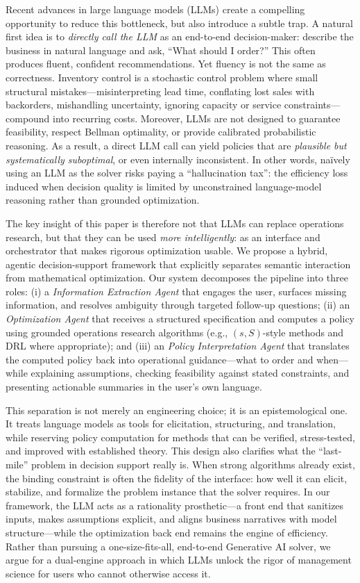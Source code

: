   

Recent advances in large language models (LLMs) create a compelling opportunity to reduce this bottleneck, but also introduce a subtle trap. A natural first idea is to \emph{directly call the LLM} as an end-to-end decision-maker: describe the business in natural language and ask, “What should I order?” This often produces fluent, confident recommendations. Yet fluency is not the same as correctness. Inventory control is a stochastic control problem where small structural mistakes—misinterpreting lead time, conflating lost sales with backorders, mishandling uncertainty, ignoring capacity or service constraints—compound into recurring costs. Moreover, LLMs are not designed to guarantee feasibility, respect Bellman optimality, or provide calibrated probabilistic reasoning. As a result, a direct LLM call can yield policies that are \emph{plausible but systematically suboptimal}, or even internally inconsistent. In other words, naïvely using an LLM as the solver risks paying a “hallucination tax”: the efficiency loss induced when decision quality is limited by unconstrained language-model reasoning rather than grounded optimization.

The key insight of this paper is therefore not that LLMs can replace operations research, but that they can be used \emph{more intelligently}: as an interface and orchestrator that makes rigorous optimization usable. We propose a hybrid, agentic decision-support framework that explicitly separates semantic interaction from mathematical optimization. Our system decomposes the pipeline into three roles:
(i) a \emph{Information Extraction Agent} that engages the user, surfaces missing information, and resolves ambiguity through targeted follow-up questions;
(ii) an \emph{Optimization Agent} that receives a structured specification and computes a policy using grounded operations research algorithms (e.g., $(s,S)$-style methods and DRL where appropriate);
and (iii) an \emph{Policy Interpretation Agent} that translates the computed policy back into operational guidance—what to order and when—while explaining assumptions, checking feasibility against stated constraints, and presenting actionable summaries in the user’s own language.

This separation is not merely an engineering choice; it is an epistemological one. It treats language models as tools for elicitation, structuring, and translation, while reserving {policy computation} for methods that can be verified, stress-tested, and improved with established theory. This design also clarifies what the “last-mile” problem in decision support really is. When strong algorithms already exist, the binding constraint is often the {fidelity of the interface}: how well it can elicit, stabilize, and formalize the problem instance that the solver requires. In our framework, the LLM acts as a {rationality prosthetic}—a front end that sanitizes inputs, makes assumptions explicit, and aligns business narratives with model structure—while the optimization back end remains the engine of efficiency. Rather than pursuing a one-size-fits-all, end-to-end Generative AI solver, we argue for a dual-engine approach in which LLMs unlock the rigor of management science for users who cannot otherwise access it.

